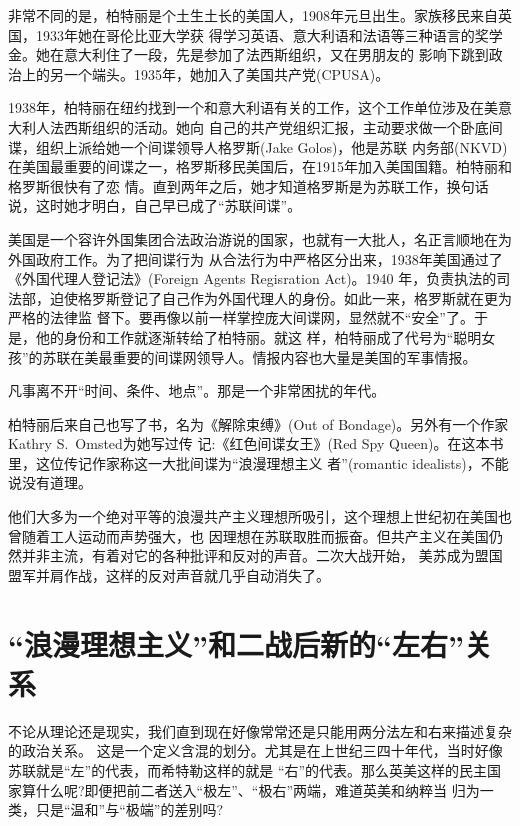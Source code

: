 \documentclass[10pt]{article}
\begin{document}
{非常不同的是，柏特丽是个土生土长的美国人，1908年元旦出生。家族移民来自英国，1933年她在哥伦比亚大学获
得学习英语、意大利语和法语等三种语言的奖学金。她在意大利住了一段，先是参加了法西斯组织，又在男朋友的
影响下跳到政治上的另一个端头。1935年，她加入了美国共产党(CPUSA)。

1938年，柏特丽在纽约找到一个和意大利语有关的工作，这个工作单位涉及在美意大利人法西斯组织的活动。她向
自己的共产党组织汇报，主动要求做一个卧底间谍，组织上派给她一个间谍领导人格罗斯(Jake Golos)，他是苏联
内务部(NKVD)在美国最重要的间谍之一，格罗斯移民美国后，在1915年加入美国国籍。柏特丽和格罗斯很快有了恋
情。直到两年之后，她才知道格罗斯是为苏联工作，换句话说，这时她才明白，自己早已成了``苏联间谍''。

美国是一个容许外国集团合法政治游说的国家，也就有一大批人，名正言顺地在为外国政府工作。为了把间谍行为
从合法行为中严格区分出来，1938年美国通过了《外国代理人登记法》(Foreign Agents Regisration Act)。1940
年，负责执法的司法部，迫使格罗斯登记了自己作为外国代理人的身份。如此一来，格罗斯就在更为严格的法律监
督下。要再像以前一样掌控庞大间谍网，显然就不``安全''了。于是，他的身份和工作就逐渐转给了柏特丽。就这
样，柏特丽成了代号为``聪明女孩''的苏联在美最重要的间谍网领导人。情报内容也大量是美国的军事情报。

凡事离不开``时间、条件、地点''。那是一个非常困扰的年代。

柏特丽后来自己也写了书，名为《解除束缚》(Out of Bondage)。另外有一个作家Kathry S.~Omsted为她写过传
记:《红色间谍女王》(Red Spy Queen)。在这本书里，这位传记作家称这一大批间谍为``浪漫理想主义
者''(romantic idealists)，不能说没有道理。

他们大多为一个绝对平等的浪漫共产主义理想所吸引，这个理想上世纪初在美国也曾随着工人运动而声势强大，也
因理想在苏联取胜而振奋。但共产主义在美国仍然并非主流，有着对它的各种批评和反对的声音。二次大战开始，
美苏成为盟国盟军并肩作战，这样的反对声音就几乎自动消失了。


\pagebreak
\section{``浪漫理想主义''和二战后新的``左右''关系}

不论从理论还是现实，我们直到现在好像常常还是只能用两分法\myrule 左和右\myrule 来描述复杂的政治关系。
这是一个定义含混的划分。尤其是在上世纪三四十年代，当时好像苏联就是``左''的代表，而希特勒这样的就是
``右''的代表。那么英美这样的民主国家算什么呢?即便把前二者送入``极左''、``极右''两端，难道英美和纳粹当
归为一类，只是``温和''与``极端''的差别吗?

}
\end{document}
